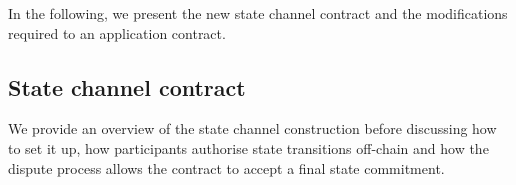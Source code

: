 \documentclass{article}
\begin{document}
In the following, we present the new state channel contract and the modifications required to an application contract. 


\subsection{State channel contract}


We provide an overview of the state channel construction before discussing how to set it up, how participants authorise state transitions off-chain and how the dispute process allows the contract to accept a final state commitment. 
\end{document}
